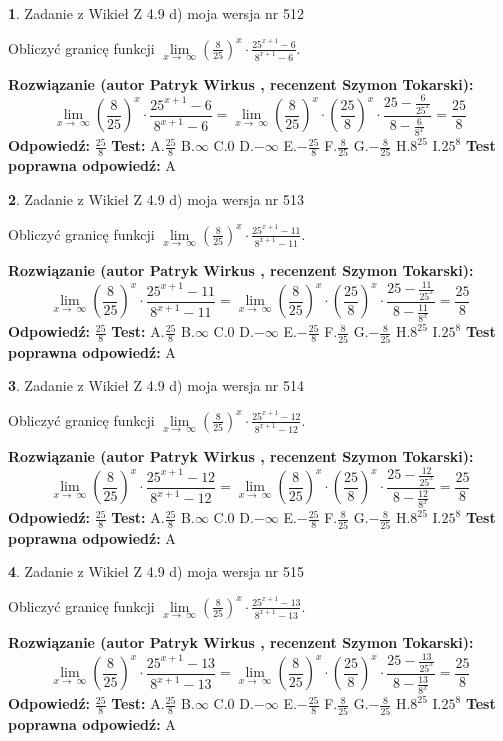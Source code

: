 \documentclass[12pt, a4paper]{article}
\theoremstyle{definition} %
\newtheorem{zad}{}
\newcommand{\zadStart}[1]{\begin{zad}#1\newline}
\newcommand{\zadStop}{\end{zad}}
\newcommand{\rozwStart}[2]{\noindent \textbf{Rozwiązanie (autor #1 , recenzent #2): }\newline}
\newcommand{\rozwStop}{\newline}
\newcommand{\odpStart}{\noindent \textbf{Odpowiedź:}\newline}
\newcommand{\odpStop}{\newline}
\newcommand{\testStart}{\noindent \textbf{Test:}\newline}
\newcommand{\testStop}{\newline}
\newcommand{\kluczStart}{\noindent \textbf{Test poprawna odpowiedź:}\newline}
\newcommand{\kluczStop}{\newline}
\begin{document}
\zadStart{Zadanie z Wikieł Z 4.9 d) moja wersja nr 512}


Obliczyć granicę funkcji  $\lim\limits_{x\to\ \infty}(\frac{8}{25})^{x}\cdot\frac{25^{x+1}-6}{8^{x+1}-6}$.
\zadStop
\rozwStart{Patryk Wirkus}{Szymon Tokarski}
$$\lim\limits_{x\to\ \infty}(\frac{8}{25})^{x}\cdot\frac{25^{x+1}-6}{8^{x+1}-6}=\lim\limits_{x\to\ \infty}(\frac{8}{25})^{x}\cdot(\frac{25}{8})^{x} \cdot \frac{25-\frac{6}{25^{x}}}{8-\frac{6}{8^{x}}} = \frac{25}{8}$$
\rozwStop
\odpStart
$\frac{25}{8}$
\odpStop
\testStart
A.$\frac{25}{8}$ B.$\infty$ C.$0$ D.$-\infty$ E.$-\frac{25}{8}$
F.$\frac{8}{25}$ G.$-\frac{8}{25}$
H.$8^{25}$
I.$25^{8}$
\testStop
\kluczStart
A
\kluczStop



\zadStart{Zadanie z Wikieł Z 4.9 d) moja wersja nr 513}


Obliczyć granicę funkcji  $\lim\limits_{x\to\ \infty}(\frac{8}{25})^{x}\cdot\frac{25^{x+1}-11}{8^{x+1}-11}$.
\zadStop
\rozwStart{Patryk Wirkus}{Szymon Tokarski}
$$\lim\limits_{x\to\ \infty}(\frac{8}{25})^{x}\cdot\frac{25^{x+1}-11}{8^{x+1}-11}=\lim\limits_{x\to\ \infty}(\frac{8}{25})^{x}\cdot(\frac{25}{8})^{x} \cdot \frac{25-\frac{11}{25^{x}}}{8-\frac{11}{8^{x}}} = \frac{25}{8}$$
\rozwStop
\odpStart
$\frac{25}{8}$
\odpStop
\testStart
A.$\frac{25}{8}$ B.$\infty$ C.$0$ D.$-\infty$ E.$-\frac{25}{8}$
F.$\frac{8}{25}$ G.$-\frac{8}{25}$
H.$8^{25}$
I.$25^{8}$
\testStop
\kluczStart
A
\kluczStop



\zadStart{Zadanie z Wikieł Z 4.9 d) moja wersja nr 514}


Obliczyć granicę funkcji  $\lim\limits_{x\to\ \infty}(\frac{8}{25})^{x}\cdot\frac{25^{x+1}-12}{8^{x+1}-12}$.
\zadStop
\rozwStart{Patryk Wirkus}{Szymon Tokarski}
$$\lim\limits_{x\to\ \infty}(\frac{8}{25})^{x}\cdot\frac{25^{x+1}-12}{8^{x+1}-12}=\lim\limits_{x\to\ \infty}(\frac{8}{25})^{x}\cdot(\frac{25}{8})^{x} \cdot \frac{25-\frac{12}{25^{x}}}{8-\frac{12}{8^{x}}} = \frac{25}{8}$$
\rozwStop
\odpStart
$\frac{25}{8}$
\odpStop
\testStart
A.$\frac{25}{8}$ B.$\infty$ C.$0$ D.$-\infty$ E.$-\frac{25}{8}$
F.$\frac{8}{25}$ G.$-\frac{8}{25}$
H.$8^{25}$
I.$25^{8}$
\testStop
\kluczStart
A
\kluczStop



\zadStart{Zadanie z Wikieł Z 4.9 d) moja wersja nr 515}


Obliczyć granicę funkcji  $\lim\limits_{x\to\ \infty}(\frac{8}{25})^{x}\cdot\frac{25^{x+1}-13}{8^{x+1}-13}$.
\zadStop
\rozwStart{Patryk Wirkus}{Szymon Tokarski}
$$\lim\limits_{x\to\ \infty}(\frac{8}{25})^{x}\cdot\frac{25^{x+1}-13}{8^{x+1}-13}=\lim\limits_{x\to\ \infty}(\frac{8}{25})^{x}\cdot(\frac{25}{8})^{x} \cdot \frac{25-\frac{13}{25^{x}}}{8-\frac{13}{8^{x}}} = \frac{25}{8}$$
\rozwStop
\odpStart
$\frac{25}{8}$
\odpStop
\testStart
A.$\frac{25}{8}$ B.$\infty$ C.$0$ D.$-\infty$ E.$-\frac{25}{8}$
F.$\frac{8}{25}$ G.$-\frac{8}{25}$
H.$8^{25}$
I.$25^{8}$
\testStop
\kluczStart
A
\kluczStop
\end{document}
